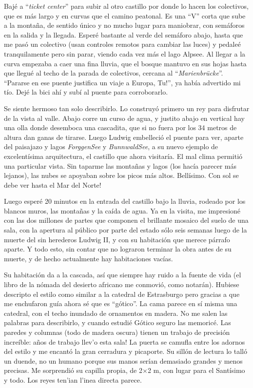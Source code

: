 Baj\'e a ``\emph{ticket center}'' para subir al otro castillo por donde lo
hacen los colectivos, que es m\'as largo y en curvas que el camino peatonal.
Es una ``{\small V}'' corta que sube a la monta\~na, de sentido \'unico y no
mucho lugar para maniobrar, con sem\'aforos en la salida y la llegada.
Esper\'e bastante al verde del sem\'aforo abajo, hasta que me pas\'o un
colectivo (usan controles remotos para cambiar las luces) y pedale\'e
tranquilamente pero sin parar, viendo cada vez m\'as el lago Alpsee. Al llegar
a la curva empezaba a caer una fina lluvia, que el bosque mantuvo en sus hojas
hasta que llegu\'e al techo de la parada de colectivos, cercana al
``\emph{Marienbr\"ucke}''. ``\textexclamdown Pararse en ese puente justifica
un viaje a Europa, Tu!'', ya hab\'ia advertido mi t\'io. Dej\'e la bici
ah\'i y sub\'i al puente para corroborarlo.

Se siente hermoso tan solo describirlo. Lo construy\'o primero un
rey para disfrutar de la vista al valle. Abajo corre un curso de agua, y
justito abajo en vertical hay una olla donde desemboca una
cascadita, que si no fuera por los 34 metros de altura dan ganas de tirarse.
Luego Ludwig embelleci\'o el puente para ver, aparte del paisajazo y lagos
\emph{ForggenSee} y \emph{BunnwaldSee}, a su nuevo ejemplo de excelent\'isima
arquitectura, el castillo que ahora visitar\'ia. El mal clima permiti\'o una
particular vista. Sin taparme las monta\~nas y lagos (los hac\'ia parecer
m\'as lejanos), las nubes se apoyaban sobre los picos m\'as altos.
Bell\'isimo. \textexclamdown Con sol se debe ver hasta el Mar del Norte!

Luego esper\'e 20 minutos en la entrada del castillo bajo la lluvia, rodeado
por los blancos muros, las monta\~nas y la ca\'ida de agua. Ya en la visita,
me impresion\'e con las dos millones de partes que componen el brillante
mosaico del suelo de una sala, con la apertura al p\'ublico por parte del
estado s\'olo seis semanas luego de la muerte del sin herederos Ludwig II, y
con su habitaci\'on que merece p\'arrafo aparte. Y todo esto, sin contar que
no lograron terminar la obra antes de su muerte, y de hecho actualmente hay
habitaciones vac\'ias.

Su habitaci\'on da a la cascada, as\'i que siempre hay ruido a la fuente de
vida (el libro de la n\'omada del desierto africano me conmovi\'o, como
notar\'an). Hubiese descripto el estilo como similar a la catedral de
Estrasburgo pero gracias a que me enchufaron gu\'ia ahora s\'e que es
``g\'otico''. La cama parece en s\'i misma una catedral, con el techo inundado
de ornamentos en madera. No me salen las palabras para describirlo, y cuando
estudi\'e G\'otico seguro las memoric\'e. Las paredes y columnas (todo de madera
oscura) tienen un trabajo de precisi\'on incre\'ible:  a\~nos
de trabajo llev'o esta sala! La puerta se camufla entre los adornos del estilo y
me encant\'o la gran cerradura y picaporte. Su sill\'on de lectura lo tall\'o un
duende, no un humano porque sus manos ser\'ian demasiado grandes y menos
precisas. Me sorprendi\'o su capilla propia, de 2$\times$2 m, con lugar para el
Sant\'isimo y todo. Los reyes ten'ian l'inea directa parece.

